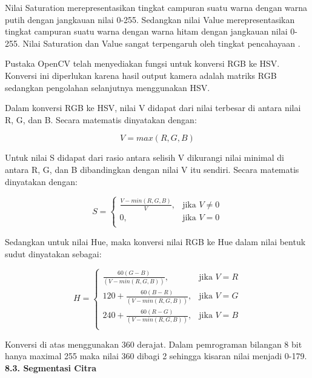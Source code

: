 \documentclass[a4paper,12pt]{article}
\begin{document}
Nilai Saturation merepresentasikan tingkat campuran suatu warna dengan warna putih dengan jangkauan nilai 0-255.
Sedangkan nilai Value merepresentasikan tingkat campuran suatu warna dengan warna hitam dengan jangkauan nilai 0-255.
Nilai Saturation dan Value sangat terpengaruh oleh tingkat pencahayaan \cite{opencv_intro} .

Pustaka OpenCV telah menyediakan fungsi untuk konversi RGB ke HSV.
Konversi ini diperlukan karena hasil output kamera adalah matriks RGB sedangkan pengolahan selanjutnya menggunakan HSV.

Dalam konversi RGB ke HSV, nilai V didapat dari nilai terbesar di antara nilai R, G, dan B. 
Secara matematis dinyatakan dengan:

\begin{equation}
  V = max(R,G,B)
\end{equation}

Untuk nilai S didapat dari rasio antara selisih V dikurangi nilai minimal di antara R, G, dan B dibandingkan dengan nilai V itu sendiri.
Secara matematis dinyatakan dengan:

\begin{equation}
  S =  
  \begin{cases}
      \frac{V-min(R,G,B)}{V},& \text{jika } V\neq 0\\
      0,              & \text{jika } V = 0\\
  \end{cases}
\end{equation}


Sedangkan untuk nilai Hue, maka konversi nilai RGB ke Hue dalam nilai bentuk sudut dinyatakan sebagai:

\begin{equation}
  H =  
  \begin{cases}
      \frac{60(G-B)}{(V-min(R,G,B))},& \text{jika } V = R\\
      120 + \frac{60(B-R)}{(V-min(R,G,B))},& \text{jika } V = G\\
      240 + \frac{60(R-G)}{(V-min(R,G,B))},& \text{jika } V = B\\
  \end{cases}
\end{equation}

Konversi di atas menggunakan 360 derajat.
Dalam pemrograman bilangan 8 bit hanya maximal 255 maka nilai 360 dibagi 2 sehingga kisaran nilai menjadi 0-179.
\\[10pt]
\indent \textbf{8.3. \hspace{8pt} Segmentasi Citra}
\end{document}
